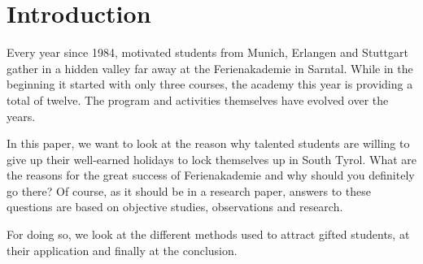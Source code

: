 \section{Introduction}
Every year since 1984, motivated students from Munich, Erlangen and Stuttgart gather in a hidden valley far away at the Ferienakademie in Sarntal. While in the beginning it started with only three courses, the academy this year is providing a total of twelve. The program and activities themselves have evolved over the years. 

In this paper, we want to look at the reason why talented students are willing to give up their well-earned holidays to lock themselves up in South Tyrol. What are the reasons for the great success of Ferienakademie and why should you definitely go there? Of course, as it should be in a research paper, answers to these questions are based on objective studies, observations and research.

For doing so, we look at the different methods used to attract gifted students, at their application and finally at the conclusion.


